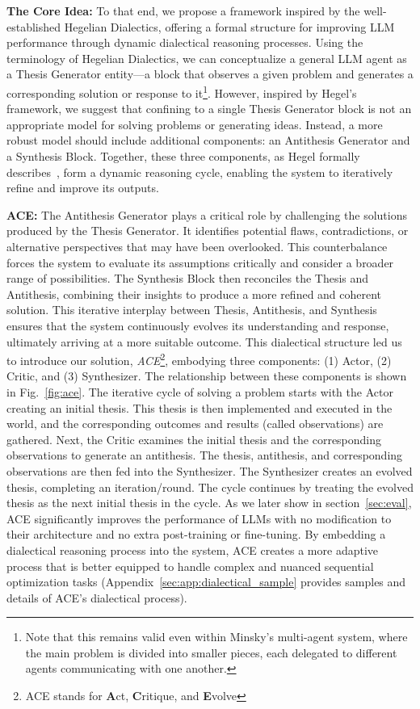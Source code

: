 \textbf{The Core Idea:}
To that end, we propose a framework inspired by the well-established Hegelian Dialectics, offering a formal structure for improving LLM performance through dynamic dialectical reasoning processes.
Using the terminology of Hegelian Dialectics, we can conceptualize a general LLM agent as a Thesis Generator entity—a block that observes a given problem and generates a corresponding solution or response to it\footnote{Note that this remains valid even within Minsky's multi-agent system, where the main problem is divided into smaller pieces, each delegated to different agents communicating with one another.}. However, inspired by Hegel's framework, we suggest that confining to a single Thesis Generator block is not an appropriate model for solving problems or generating ideas. Instead, a more robust model should include additional components: an Antithesis Generator and a Synthesis Block. Together, these three components, as Hegel formally describes~\cite{hegel_phenomenology_spirit,hegel_science_logic}, form a dynamic reasoning cycle, enabling the system to iteratively refine and improve its outputs.

\textbf{ACE:}
The Antithesis Generator plays a critical role by challenging the solutions produced by the Thesis Generator. It identifies potential flaws, contradictions, or alternative perspectives that may have been overlooked. This counterbalance forces the system to evaluate its assumptions critically and consider a broader range of possibilities. The Synthesis Block then reconciles the Thesis and Antithesis, combining their insights to produce a more refined and coherent solution. This iterative interplay between Thesis, Antithesis, and Synthesis ensures that the system continuously evolves its understanding and response, ultimately arriving at a more suitable outcome.
This dialectical structure led us to introduce our solution, \textit{ACE}\footnote{ACE stands for \textbf{A}ct, \textbf{C}ritique, and \textbf{E}volve}, embodying three components: (1) Actor, (2) Critic, and (3) Synthesizer. The relationship between these components is shown in Fig.~\ref{fig:ace}.
The iterative cycle of solving a problem starts with the Actor creating an initial thesis. This thesis is then implemented and executed in the world, and the corresponding outcomes and results (called observations) are gathered. Next, the Critic examines the initial thesis and the corresponding observations to generate an antithesis. The thesis, antithesis, and corresponding observations are then fed into the Synthesizer. The Synthesizer creates an evolved thesis, completing an iteration/round. The cycle continues by treating the evolved thesis as the next initial thesis in the cycle.
As we later show in section~\ref{sec:eval}, ACE significantly improves the performance of LLMs with no modification to their architecture and no extra post-training or fine-tuning. By embedding a dialectical reasoning process into the system, ACE creates a more adaptive process that is better equipped to handle complex and nuanced sequential optimization tasks (Appendix~\ref{sec:app:dialectical_sample} provides samples and details of ACE's dialectical process).

